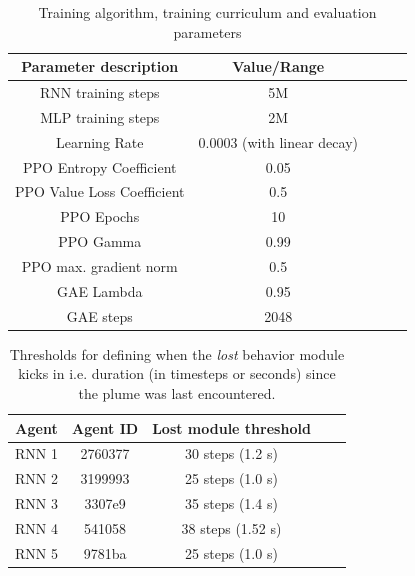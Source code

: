 \documentclass[5p,twocolumn,authoryear]{elsarticle}
\begin{document}
\begin{table}[h!]
    \centering
    \begin{tabular}{ccccc}
     \hline\hline
     \textbf{Parameter description} & \textbf{Value/Range} \\
     \hline   
        RNN training steps & 5M  \\ \hline
        MLP training steps & 2M  \\ \hline
        Learning Rate & 0.0003 (with linear decay) \\ \hline
        PPO Entropy Coefficient & 0.05 \\ \hline
        PPO Value Loss Coefficient & 0.5 \\ \hline
        PPO Epochs & 10 \\ \hline
        PPO Gamma & 0.99 \\ \hline
        PPO max. gradient norm & 0.5 \\ \hline
        GAE Lambda & 0.95 \\ \hline
        GAE steps & 2048 \\ \hline
     \hline
    \end{tabular}
    \caption{Training algorithm, training curriculum and evaluation parameters}
    \label{table_supp_training}
\end{table}

\clearpage

\begin{table}[h!]
    \centering
    \begin{tabular}{ccccc}
     \hline\hline
     \textbf{Agent} & \textbf{Agent ID} & \textbf{Lost module threshold}   \\
     \hline   
        RNN 1 & 2760377 & 30 steps (1.2 s) \\ \hline
        RNN 2 & 3199993 & 25 steps (1.0 s) \\ \hline  
        RNN 3 & 3307e9 & 35 steps (1.4 s) \\ \hline
        RNN 4 & 541058 & 38 steps (1.52 s) \\ \hline
        RNN 5 & 9781ba & 25 steps (1.0 s) \\ \hline
     \hline
    \end{tabular}
    \caption[Thresholds defining behavioral module changes]{Thresholds for defining when the \textit{lost} behavior module kicks in i.e. duration (in timesteps or seconds) since the plume was last encountered.}
\label{table_supp_module_threshold}
\end{table}
\end{document}
